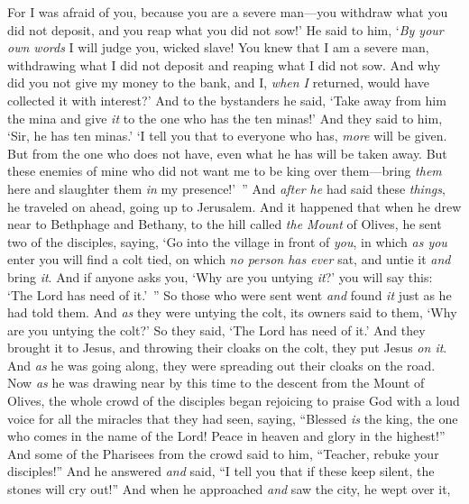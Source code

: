 \begin{biblechapter}
\verse For I was afraid of you, because you are a severe man—you withdraw what you did not deposit, and you reap what you did not sow!’
\verse He said to him, ‘\textit{By your own words} I will judge you, wicked slave! You knew that I am a severe man, withdrawing what I did not deposit and reaping what I did not sow.
\verse And why did you not give my money to the bank, and I, \textit{when I} returned, would have collected it with interest?’
\verse And to the bystanders he said, ‘Take away from him the mina and give \textit{it} to the one who has the ten minas!’
\verse And they said to him, ‘Sir, he has ten minas.’
\verse ‘I tell you that to everyone who has, \textit{more} will be given. But from the one who does not have, even what he has will be taken away.
\verse But these enemies of mine who did not want me to be king over them—bring \textit{them} here and slaughter them \textit{in} my presence!’ ”
 And \textit{after he} had said these \textit{things}, he traveled on ahead, going up to Jerusalem.
\verse And it happened that when he drew near to Bethphage and Bethany, to the hill called \textit{the Mount} of Olives, he sent two of the disciples,
\verse saying, ‘Go into the village in front of \textit{you}, in which \textit{as you} enter you will find a colt tied, on which \textit{no person has ever} sat, and untie it \textit{and} bring \textit{it}.
\verse And if anyone asks you, ‘Why are you untying \textit{it}?’ you will say this: ‘The Lord has need of it.’ ”
\verse So those who were sent went \textit{and} found \textit{it} just as he had told them.
\verse And \textit{as} they were untying the colt, its owners said to them, ‘Why are you untying the colt?’
\verse So they said, ‘The Lord has need of it.’
\verse And they brought it to Jesus, and throwing their cloaks on the colt, they put Jesus \textit{on it}.
\verse And \textit{as} he was going along, they were spreading out their cloaks on the road.
\verse Now \textit{as} he was drawing near by this time to the descent from the Mount of Olives, the whole crowd of the disciples began rejoicing to praise God with a loud voice for all the miracles that they had seen,
\verse saying, “Blessed \textit{is} the king, 
the one who comes in the name of the Lord! 
Peace in heaven 
and glory in the highest!”
\verse And some of the Pharisees from the crowd said to him, “Teacher, rebuke your disciples!”
\verse And he answered \textit{and} said, “I tell you that if these keep silent, the stones will cry out!”
 And when he approached \textit{and} saw the city, he wept over it,

\end{biblechapter}
